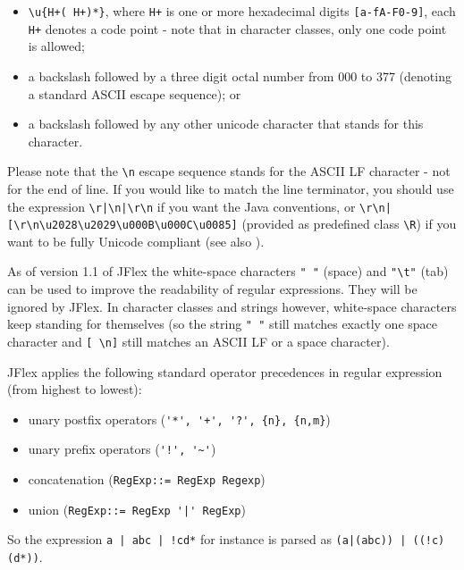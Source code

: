 \documentclass[11pt]{scrartcl}
\begin{document}
\begin{itemize}
\begin{itemize}
  \item
   \verb=\u{H+( H+)*}=, where \verb=H+= is one or more hexadecimal digits
   \texttt{[a-fA-F0-9]}, each \verb=H+= denotes a code point - note that in
   character classes, only one code point is allowed;

  \item
    a backslash followed by a three digit octal number from 000 to 377 (denoting
    a standard ASCII escape sequence); or

  \item
    a backslash followed by any other unicode character that stands for this
    character.

  \end{itemize}
  
\end{itemize}

Please note that the \verb+\n+ escape sequence stands for the ASCII
LF character - not for the end of line. If you would like to match the
line terminator, you should use the expression \verb+\r|\n|\r\n+ if you want
the Java conventions, or \verb+\r\n|[\r\n\u2028\u2029\u000B\u000C\u0085]+
(provided as predefined class \verb+\R+) if you want to be fully Unicode
compliant (see also \cite{unicode_rep}).

As of version 1.1 of JFlex the white-space characters \texttt{" "}
(space) and \verb+"\t"+ (tab) can be used to improve the readability of
regular expressions. They will be ignored by JFlex. In character
classes and strings however, white-space characters keep standing for
themselves (so the string \texttt{" "} still matches exactly one space
character and \verb+[ \n]+ still matches an ASCII LF or a space
character).

JFlex applies the following standard operator precedences in regular
expression (from highest to lowest):

\begin{itemize}
\item
unary postfix operators (\verb-'*', '+', '?', {n}, {n,m}-)

\item
unary prefix operators (\verb-'!', '~'-)

\item
concatenation (\texttt{RegExp::= RegExp Regexp})

\item
union (\verb-RegExp::= RegExp '|' RegExp-)
\end{itemize}

So the expression \verb+a | abc | !cd*+ for instance is parsed as 
\verb+(a|(abc)) | ((!c)(d*))+.
\end{document}
